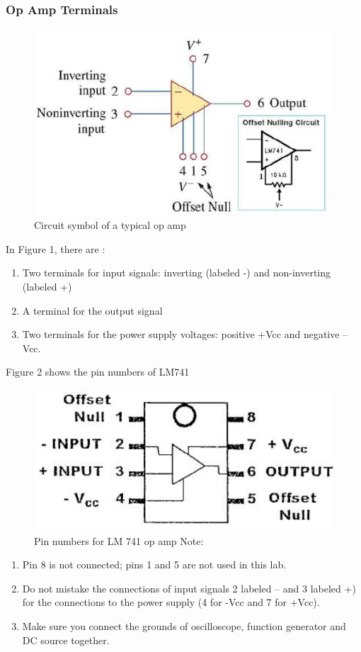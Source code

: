 \documentclass[12pt]{article}
\begin{document}
\subsubsection{Op Amp Terminals}
\begin{figure}[H]
\centering
\includegraphics[scale=0.5]{P1.jpg}
\caption{Circuit symbol of a typical op amp}
\end{figure}
In Figure 1, there are :
\begin{enumerate}
\item Two terminals for input signals: inverting (labeled -) and non-inverting (labeled +)
\item A terminal for the output signal
\item Two terminals for the power supply voltages: positive +Vcc and negative –Vcc.
\end{enumerate}
Figure 2 shows the pin numbers of LM741
\begin{figure}[H]
\centering
\includegraphics[scale=0.5]{P2.jpg}
\caption{Pin numbers for LM 741 op amp Note:}
\end{figure}
\begin{enumerate}
\item Pin 8 is not connected; pins 1 and 5 are not used in this lab.
\item Do not mistake the connections of input signals 2 labeled – and 3 labeled +) for the connections to the power supply (4 for -Vcc and 7 for +Vcc).
\item Make sure you connect the grounds of oscilloscope, function generator and DC source together.
\end{enumerate}
\end{document}
